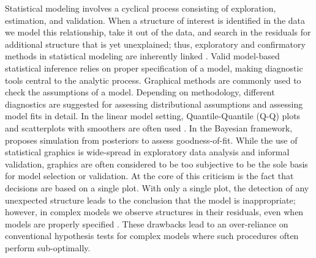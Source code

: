 \documentclass[12pt]{article} %
\begin{document}
Statistical modeling involves a cyclical process consisting of exploration, estimation, and validation. When a structure of interest is identified in the data we model this relationship, take it out of the data, and search in the residuals for additional structure that is yet unexplained; thus, exploratory and confirmatory methods in statistical modeling are inherently linked \citep{tukey:eda}.
Valid model-based statistical inference relies on proper specification of a model, making diagnostic tools central to the analytic process. Graphical methods are commonly used to check the assumptions of a model. Depending on methodology, different diagnostics are suggested for assessing distributional assumptions and assessing model fits in detail. In the linear model setting, Quantile-Quantile (Q-Q) plots and scatterplots with smoothers are often used \citep{Cook:1999}. In the Bayesian framework, \citet{Gelman:2004gg} proposes simulation from posteriors to assess goodness-of-fit. 
While the use of statistical graphics is wide-spread in exploratory data analysis and informal validation, graphics are often considered to be too subjective to be the sole basis for model selection or validation. 
At the core of this criticism is the fact that decisions are  based on a single plot. With only a single plot,  the detection of any unexpected structure leads to the conclusion that the model is inappropriate; however, in complex models we observe structures 
in their residuals, even when models are properly specified \citep[c.f.,][]{Morrell:2000ve, Gelman:2000dr}. 
These drawbacks lead to an over-reliance on conventional hypothesis tests %
for complex models where such procedures often perform sub-optimally.

%
\end{document}
